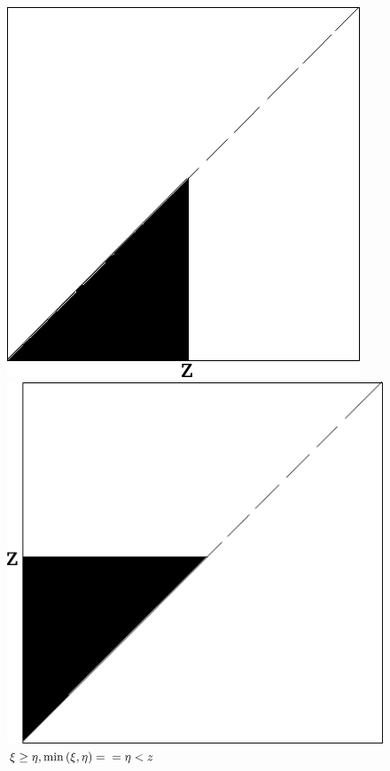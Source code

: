 \begin{enumerate}[label=\alph*)]
\begin{figure}[h!]
  \centering
  \begin{minipage}[b]{0.4\textwidth}
    \includegraphics[width=\textwidth]{./pictures/4_5.png}
    \caption{$ \xi < \eta, \min \left( \xi, \eta \right) = \\ = \xi < z$}
    \label{fig:45}
  \end{minipage}
  \hfill
  \begin{minipage}[b]{0.4\textwidth}
    \includegraphics[width=\textwidth]{./pictures/4_5_1.png}
    \caption{$ \xi \geq \eta, \min \left( \xi, \eta \right) = \\ = \eta < z$}
    \label{fig:451}
  \end{minipage}
\end{figure}


\end{enumerate}
